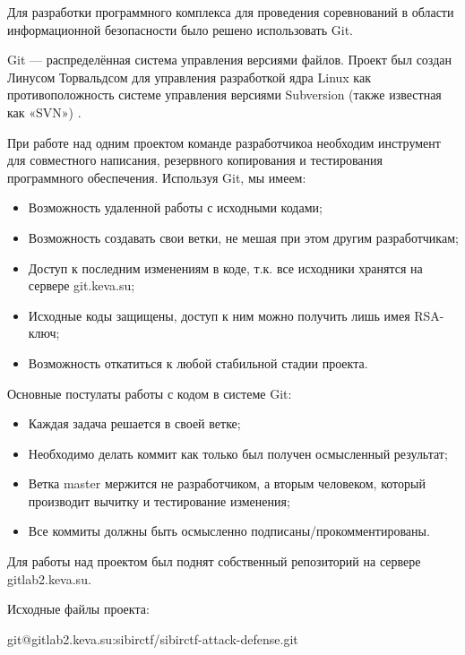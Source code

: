 Для разработки программного комплекса для проведения соревнований в области информационной безопасности было решено использовать Git.

Git --- распределённая система управления версиями файлов. Проект был создан Линусом Торвальдсом для управления разработкой ядра Linux  как противоположность  системе управления версиями Subversion (также известная как «SVN») \cite{progit}.

При работе над одним проектом команде разработчикоа необходим инструмент для совместного написания, резервного копирования и тестирования программного обеспечения. Используя Git, мы имеем:
\begin{itemize}
\item Возможность удаленной работы с исходными кодами;
\item Возможность создавать свои ветки, не мешая при этом другим разработчикам;
\item Доступ к последним изменениям в коде, т.к. все исходники хранятся на сервере git.keva.su;
\item Исходные коды защищены, доступ к ним можно получить лишь имея RSA-ключ;
\item Возможность откатиться к любой стабильной стадии проекта.
\end{itemize}

Основные постулаты работы с кодом в системе Git:

\begin{itemize}
\item Каждая задача решается в своей ветке;
\item Необходимо делать коммит как только был получен осмысленный результат;
\item Ветка master мержится не разработчиком, а вторым человеком, который производит вычитку и тестирование изменения;
\item Все коммиты должны быть осмысленно подписаны/прокомментированы.
\end{itemize}

Для работы над проектом был поднят собственный репозиторий на сервере gitlab2.keva.su.

Исходные файлы проекта:

git@gitlab2.keva.su:sibirctf/sibirctf-attack-defense.git

